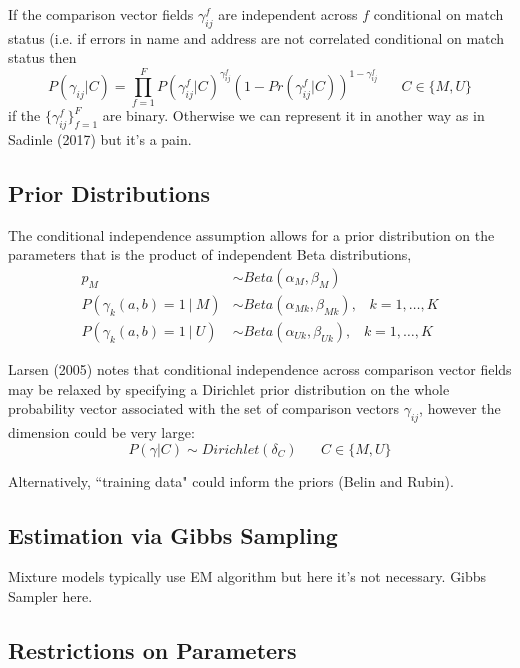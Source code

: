 \documentclass[11pt,reqno]{amsart}
\begin{document}
If the comparison vector fields $\gamma_{ij}^f$ are independent across $f$ conditional on match status (i.e. if errors in name and address are not correlated conditional on match status %
then
 $$P(\gamma_{ij} | C) = \prod_{f=1}^F P(\gamma_{ij}^f | C)^{\gamma_{ij}^f}(1-Pr(\gamma_{ij}^f | C))^{1-\gamma_{ij}^f} \hspace{20pt} C\in \{M, U\} $$
 if the $\{\gamma_{ij}^f\}_{f=1}^F$ are binary.  %
 Otherwise we can represent it in another way as in Sadinle (2017) but it's a pain.
 
\subsection{Prior Distributions} The conditional independence assumption allows for a prior distribution on the parameters that is the product of independent Beta distributions, 
\begin{align*}
p_M &\sim Beta(\alpha_M, \beta_M) \\
P(\gamma_{k} (a,b) =1\ |\ M) &\sim Beta(\alpha_{Mk}, \beta_{Mk}), \hspace{10pt} k = 1,\dots, K \\
P(\gamma_{k} (a,b) =1 \ |\  U) &\sim Beta(\alpha_{Uk}, \beta_{Uk}), \hspace{10pt} k = 1,\dots, K
\end{align*} 
 
Larsen (2005) notes that conditional independence across comparison vector fields may be relaxed by specifying a Dirichlet prior distribution on the whole probability vector associated with the set of comparison vectors $\gamma_{ij}$, however the dimension could be very large:
\[ P(\gamma | C) \sim Dirichlet(\delta_C) \hspace{20pt} C\in\{M,U\}\]

Alternatively, ``training data" could inform the priors (Belin and Rubin). %
 
\subsection{Estimation via Gibbs Sampling} 

Mixture models typically use EM algorithm but here it's not necessary.  Gibbs Sampler here. 

\subsection{Restrictions on Parameters}
\end{document}
